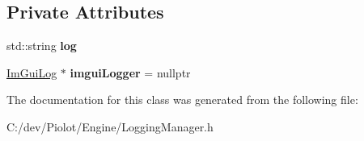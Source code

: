 \subsection*{Private Attributes}
\begin{DoxyCompactItemize}
\item 
\mbox{\label{classpiolot_1_1_logging_manager_a09a47d777f82d02c4420fc1832317e2b}} 
std\+::string {\bfseries log}
\item 
\mbox{\label{classpiolot_1_1_logging_manager_a931c51fe236e3856d28b450d250cea8d}} 
\mbox{\hyperlink{structpiolot_1_1_im_gui_log}{Im\+Gui\+Log}} $\ast$ {\bfseries imgui\+Logger} = nullptr
\end{DoxyCompactItemize}


The documentation for this class was generated from the following file\+:\begin{DoxyCompactItemize}
\item 
C\+:/dev/\+Piolot/\+Engine/Logging\+Manager.\+h\end{DoxyCompactItemize}
